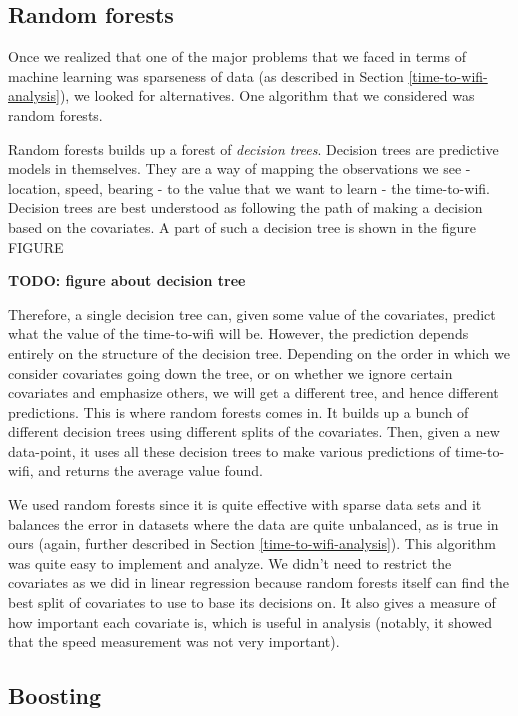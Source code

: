 \documentclass[12pt, fleqn]{article}
\begin{document}
\subsection{Random forests}
\label{time-to-wifi-random-forests}

Once we realized that one of the major problems that we faced 
in terms of machine learning was sparseness of data (as described in Section \ref{time-to-wifi-analysis}), 
we looked for alternatives. One algorithm that we considered was random forests. 

Random forests builds up a forest of \emph{decision trees}. 
Decision trees are predictive models in themselves. They are a way of mapping the observations 
we see - location, speed, bearing - to the value that we want to learn - the 
time-to-wifi. Decision trees are best understood as following the path of making 
a decision based on the covariates. A part of such a decision tree is shown in the 
figure FIGURE

\textbf{TODO: figure about decision tree}

Therefore, a single decision tree can, given some value of the covariates, 
predict what the value of the time-to-wifi will be. However, the prediction 
depends entirely on the structure of the decision tree. Depending on the order 
in which we consider covariates going down the tree, or on whether we ignore 
certain covariates and emphasize others, we will get a different tree, and hence 
different predictions. This is where random forests comes in. It builds up a bunch 
of different decision trees using different splits of the covariates. 
Then, given a new data-point, it uses all these decision trees to make various 
predictions of time-to-wifi, and returns the average value found. 

We used random forests since it is quite effective with sparse data sets and it balances the error in datasets 
where the data are quite unbalanced, as is true in ours (again, further described in Section \ref{time-to-wifi-analysis}). 
This algorithm was quite easy to implement and analyze. We didn’t need to restrict the 
covariates as we did in linear regression because random forests itself can find the best split 
of covariates to use to base its decisions on. It also gives a measure of how important each 
covariate is, which is useful in analysis (notably, it showed that the speed measurement 
was not very important).

\subsection{Boosting}
\label{time-to-wifi-boosting}
\end{document}
